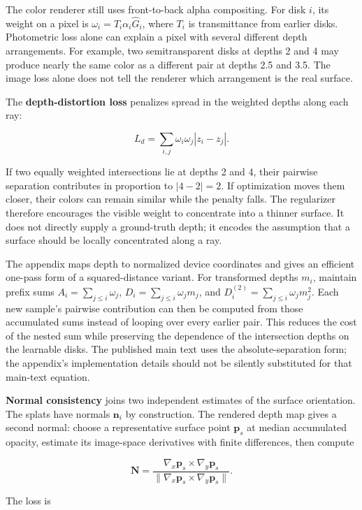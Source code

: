 The color renderer still uses front-to-back alpha compositing. For disk \(i\), its weight on a pixel is \(\omega_i=T_i\alpha_i\widehat G_i\), where \(T_i\) is transmittance from earlier disks. Photometric loss alone can explain a pixel with several different depth arrangements. For example, two semitransparent disks at depths 2 and 4 may produce nearly the same color as a different pair at depths 2.5 and 3.5. The image loss alone does not tell the renderer which arrangement is the real surface.

The \textbf{depth-distortion loss} penalizes spread in the weighted depths along each ray:

\[L_d=\sum_{i,j}\omega_i\omega_j|z_i-z_j|.\]

If two equally weighted intersections lie at depths 2 and 4, their pairwise separation contributes in proportion to \(|4-2|=2\). If optimization moves them closer, their colors can remain similar while the penalty falls. The regularizer therefore encourages the visible weight to concentrate into a thinner surface. It does not directly supply a ground-truth depth; it encodes the assumption that a surface should be locally concentrated along a ray.

The appendix maps depth to normalized device coordinates and gives an efficient one-pass form of a squared-distance variant. For transformed depths \(m_i\), maintain prefix sums \(A_i=\sum_{j\le i}\omega_j\), \(D_i=\sum_{j\le i}\omega_jm_j\), and \(D_i^{(2)}=\sum_{j\le i}\omega_jm_j^2\). Each new sample's pairwise contribution can then be computed from those accumulated sums instead of looping over every earlier pair. This reduces the cost of the nested sum while preserving the dependence of the intersection depths on the learnable disks. The published main text uses the absolute-separation form; the appendix's implementation details should not be silently substituted for that main-text equation.

\textbf{Normal consistency} joins two independent estimates of the surface orientation. The splats have normals \(\mathbf{n}_i\) by construction. The rendered depth map gives a second normal: choose a representative surface point \(\mathbf{p}_s\) at median accumulated opacity, estimate its image-space derivatives with finite differences, then compute

\[\mathbf{N}=\frac{\nabla_x\mathbf{p}_s\times\nabla_y\mathbf{p}_s}{\|\nabla_x\mathbf{p}_s\times\nabla_y\mathbf{p}_s\|}.\]

The loss is

